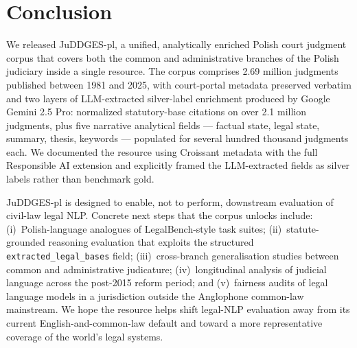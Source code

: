 \documentclass{article}
\begin{document}
\section{Conclusion}
\label{sec:conclusion}

We released JuDDGES-pl, a unified, analytically enriched Polish court judgment corpus that covers both the common and administrative branches of the Polish judiciary inside a single resource. The corpus comprises 2.69 million judgments published between 1981 and 2025, with court-portal metadata preserved verbatim and two layers of LLM-extracted silver-label enrichment produced by Google Gemini 2.5 Pro: normalized statutory-base citations on over 2.1 million judgments, plus five narrative analytical fields --- factual state, legal state, summary, thesis, keywords --- populated for several hundred thousand judgments each. We documented the resource using Croissant metadata with the full Responsible AI extension and explicitly framed the LLM-extracted fields as silver labels rather than benchmark gold.

JuDDGES-pl is designed to enable, not to perform, downstream evaluation of civil-law legal NLP. Concrete next steps that the corpus unlocks include: (i)~Polish-language analogues of LegalBench-style task suites; (ii)~statute-grounded reasoning evaluation that exploits the structured \texttt{extracted\_legal\_bases} field; (iii)~cross-branch generalisation studies between common and administrative judicature; (iv)~longitudinal analysis of judicial language across the post-2015 reform period; and (v)~fairness audits of legal language models in a jurisdiction outside the Anglophone common-law mainstream. We hope the resource helps shift legal-NLP evaluation away from its current English-and-common-law default and toward a more representative coverage of the world's legal systems.



\appendix




\newpage

\end{document}
